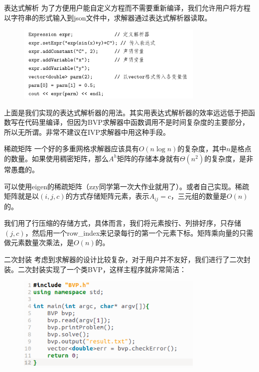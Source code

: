 \documentclass[9pt]{beamer}
\begin{document}
\begin{frame}{表达式解析}
  为了方便用户能自定义方程而不需要重新编译，我们允许用户将方程以字符串的形式输入到json文件中，求解器通过表达式解析器读取。

  \begin{figure}[H]
    \centering
    \includegraphics[width=0.8\textwidth]{pic/expr.png}
  \end{figure}

  上面是我们实现的表达式解析器的用法。其实用表达式解析器的效率远远低于把函数写在代码里编译，但因为BVP求解器中函数调用不是时间复杂度的主要部分，所以无所谓。非常不建议在IVP求解器中用这种手段。
\end{frame}

\begin{frame}{稀疏矩阵}
  一个好的多重网格求解器应该具有$O(n\log n)$的复杂度，其中$n$是格点的数量。如果使用稠密矩阵，那么$A^h$矩阵的存储本身就有$\Theta(n^2)$的复杂度，是非常愚蠢的。

  \vspace{1em}
  \pause
  可以使用eigen的稀疏矩阵（zzy同学第一次大作业就用了）。或者自己实现。稀疏矩阵就是以$(i,j,c)$的方式存储矩阵元素，表示$A_{ij}=c$，三元组的数量是$O(n)$的。

  \vspace{1em}
  \pause
  我们用了行压缩的存储方式，具体而言，我们将元素按行、列排好序，只存储$(j,c)$，然后用一个row\_index来记录每行的第一个元素下标。矩阵乘向量的只需做元素数量次乘法，是$O(n)$的。
\end{frame}

\begin{frame}{二次封装}
  考虑到求解器的设计比较复杂，对于用户并不友好，我们进行了二次封装。二次封装实现了一个类BVP，这样主程序就非常简洁：

  \begin{figure}[H]
    \centering
    \includegraphics[width=0.8\textwidth]{pic/user.png}
  \end{figure}

\end{frame}
\end{document}
